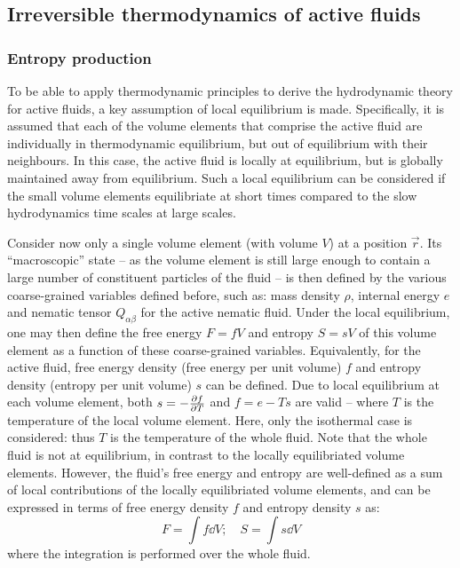 \subsection{Irreversible thermodynamics of active fluids}\label{subsec:introIrrevThermoActiveFluids}
\subsubsection{Entropy production}\label{subsubsec:introEntropyProduction}
To be able to apply thermodynamic principles to derive the hydrodynamic theory for active fluids, a key assumption of local equilibrium is made. Specifically, it is assumed that each of the volume elements that comprise the active fluid are individually in thermodynamic equilibrium, but out of equilibrium with their neighbours. In this case, the active fluid is locally at equilibrium, but is globally maintained away from equilibrium. Such a local equilibrium can be considered if the small volume elements equilibriate at short times compared to the slow hydrodynamics time scales at large scales. 

Consider now only a single volume element (with volume $V$) at a position $\vec{r}$. Its \enquote{macroscopic} state -- as the volume element is still large enough to contain a large number of constituent particles of the fluid -- is then defined by the various coarse-grained variables defined before, such as: mass density $\rho$, internal energy $e$ and nematic tensor $Q_{\alpha\beta}$ for the active nematic fluid. Under the local equilibrium, one may then define the free energy $F = fV$ and entropy $S = sV$ of this volume element as a function of these coarse-grained variables. Equivalently, for the active fluid, free energy density (free energy per unit volume) $f$ and entropy density (entropy per unit volume) $s$ can be defined. Due to local equilibrium at each volume element, both $s = -\pdv{f}{T}$ and $f = e - Ts$ are valid -- where $T$ is the temperature of the local volume element. Here, only the isothermal case is considered: thus $T$ is the temperature of the whole fluid. Note that the whole fluid is not at equilibrium, in contrast to the locally equilibriated volume elements. However, the fluid's free energy and entropy are well-defined as a sum of local contributions of the locally equilibriated volume elements, and can be expressed in terms of free energy density $f$ and entropy density $s$ as:
\begin{equation}\label{eq:introFreeEnergyEntropyDensityDefine}
    F = \int f \dd{V}; \quad S = \int s \dd{V}
\end{equation}
where the integration is performed over the whole fluid.
 
